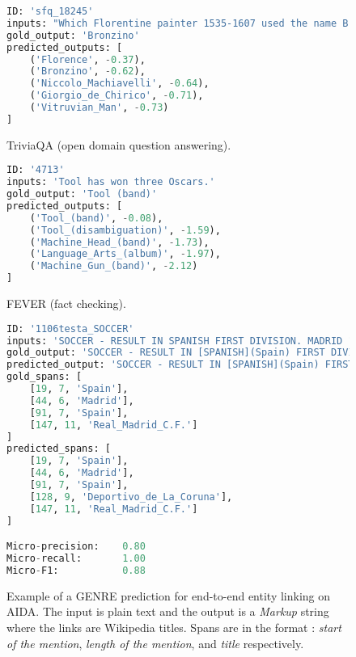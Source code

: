\documentclass{article} \usepackage{main,times}
\makeatletter
\def\genre{\textsc{GENRE}\@\xspace}
\makeatother
\begin{document}
\begin{figure*}[!ht]
\centering
\begin{subfigure}[b]{.49\textwidth}
\begin{lstlisting}[language=Python,firstnumber=1]
ID: 'sfq_18245'
inputs: "Which Florentine painter 1535-1607 used the name Bronzino after the death of his 'uncle'?"
gold_output: 'Bronzino'
predicted_outputs: [
    ('Florence', -0.37),
    ('Bronzino', -0.62),
    ('Niccolo_Machiavelli', -0.64),
    ('Giorgio_de_Chirico', -0.71),
    ('Vitruvian_Man', -0.73)
]
\end{lstlisting}
\caption{TriviaQA (open domain question answering).}
\end{subfigure}
\hfill
\begin{subfigure}[b]{.49\textwidth}
\begin{lstlisting}[language=Python,firstnumber=1]
ID: '4713'
inputs: 'Tool has won three Oscars.'
gold_output: 'Tool (band)'
predicted_outputs: [
    ('Tool_(band)', -0.08),
    ('Tool_(disambiguation)', -1.59),
    ('Machine_Head_(band)', -1.73),
    ('Language_Arts_(album)', -1.97),
    ('Machine_Gun_(band)', -2.12)
]
\end{lstlisting}
\caption{FEVER (fact checking).}
\end{subfigure}
\caption{Example of \genre predictions for the retrieval task on KILT. The input is a query and the output is a ranked list of Wikipedia article titles (we also report the log-likelihood of the solutions).}
\label{fig:example_kilt}
\end{figure*} \begin{figure}[!ht]
\centering
\begin{lstlisting}[language=Python,firstnumber=1]
ID: '1106testa_SOCCER'
inputs: 'SOCCER - RESULT IN SPANISH FIRST DIVISION. MADRID 1996-08-31 Result of game played in the Spanish first division on Saturday: Deportivo Coruna 1 Real Madrid 1.'
gold_output: 'SOCCER - RESULT IN [SPANISH](Spain) FIRST DIVISION . [MADRID](Madrid) 1996-08-31 Result of game played in the [Spanish](Spain) first division on Saturday : Deportivo Coruna 1 [Real Madrid](Real Madrid C.F.) 1.'
predicted_output: 'SOCCER - RESULT IN [SPANISH](Spain) FIRST DIVISION . [MADRID](Madrid) 1996-08-31 Result of game played in the [Spanish](Spain) first division on Saturday : [Deportivo](Deportivo de La Coruna) Coruna 1 [Real Madrid](Real Madrid C.F.) 1.'
gold_spans: [
    [19, 7, 'Spain'],
    [44, 6, 'Madrid'],
    [91, 7, 'Spain'],
    [147, 11, 'Real_Madrid_C.F.']
]
predicted_spans: [
    [19, 7, 'Spain'],
    [44, 6, 'Madrid'],
    [91, 7, 'Spain'],
    [128, 9, 'Deportivo_de_La_Coruna'],
    [147, 11, 'Real_Madrid_C.F.']
]

Micro-precision:    0.80
Micro-recall:       1.00
Micro-F1:           0.88
\end{lstlisting}
\caption{Example of a \genre prediction for end-to-end entity linking on AIDA. The input is plain text and the output is a \textit{Markup} string where the links are Wikipedia titles. Spans are in the format : \textit{start of the mention}, \textit{length of the mention}, and \textit{title} respectively.}
\label{fig:example_el}
\end{figure}
\end{document}

